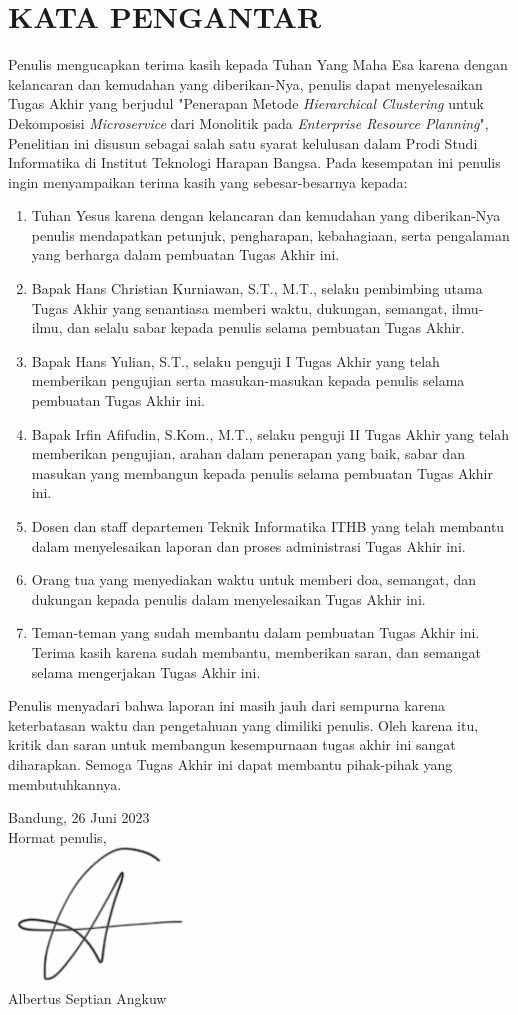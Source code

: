 \chapter*{KATA PENGANTAR}
Penulis mengucapkan terima kasih kepada Tuhan Yang Maha Esa karena dengan kelancaran dan kemudahan yang diberikan-Nya, penulis dapat menyelesaikan Tugas Akhir yang berjudul "Penerapan Metode \textit{Hierarchical Clustering} untuk Dekomposisi \textit{Microservice} dari Monolitik pada \textit{Enterprise Resource Planning}", Penelitian ini disusun sebagai salah satu syarat kelulusan dalam Prodi Studi Informatika di Institut Teknologi Harapan Bangsa. Pada kesempatan ini penulis ingin menyampaikan terima kasih yang sebesar-besarnya kepada: \\

\begin{enumerate}[nolistsep]
    \item Tuhan Yesus karena dengan kelancaran dan kemudahan yang diberikan-Nya penulis mendapatkan petunjuk, pengharapan, kebahagiaan, serta pengalaman yang berharga dalam pembuatan Tugas Akhir ini.
    \item Bapak Hans Christian Kurniawan, S.T., M.T., selaku pembimbing utama Tugas Akhir yang senantiasa memberi waktu, dukungan, semangat, ilmu-ilmu, dan selalu sabar kepada penulis selama pembuatan Tugas Akhir.
    \item Bapak Hans Yulian, S.T., selaku penguji I Tugas Akhir yang telah memberikan pengujian serta masukan-masukan kepada penulis selama pembuatan Tugas Akhir ini.
    \item Bapak Irfin Afifudin, S.Kom., M.T., selaku penguji II Tugas Akhir yang telah memberikan pengujian, arahan dalam penerapan yang baik, sabar dan masukan yang membangun kepada penulis selama pembuatan Tugas Akhir ini.
    \item Dosen dan staff departemen Teknik Informatika ITHB yang telah membantu dalam menyelesaikan laporan dan proses administrasi Tugas Akhir ini.
    \item Orang tua yang menyediakan waktu untuk memberi doa, semangat, dan dukungan kepada penulis dalam menyelesaikan Tugas Akhir ini.
    \item Teman-teman yang sudah membantu dalam pembuatan Tugas Akhir ini. Terima kasih karena sudah membantu, memberikan saran, dan semangat selama mengerjakan Tugas Akhir ini.\\
\end{enumerate}
 
Penulis menyadari bahwa laporan ini masih jauh dari sempurna karena keterbatasan waktu dan pengetahuan yang dimiliki penulis. Oleh karena itu, kritik dan saran untuk membangun kesempurnaan tugas akhir ini sangat diharapkan. Semoga Tugas Akhir ini dapat membantu pihak-pihak yang membutuhkannya.


\hfill{
\begin{flushright} Bandung, 26 Juni 2023\\
Hormat  penulis,\\
\includegraphics[width=5cm]{img/sign.png}\\
Albertus Septian Angkuw
\end{flushright}}
